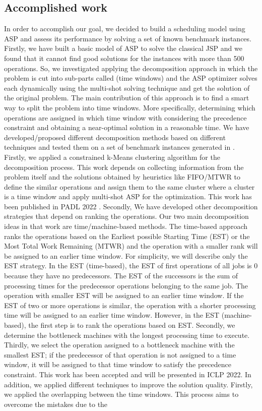 \documentclass[submission,copyright,creativecommons]{eptcs}
\begin{document}
\subsection{Accomplished work}
In order to accomplish our goal, we decided to build a scheduling model using ASP and assess its performance by solving a set of known benchmark instances. Firstly, we have built a basic model of ASP to solve the classical JSP and we found that it cannot find good solutions for the instances with more than 500 operations. So, we investigated applying the decomposition approach in which the problem is cut into sub-parts called (time windows) and the ASP optimizer solves each dynamically using the multi-shot solving technique \cite{gebser2019multi} and get the solution of the original problem. The main contribution of this approach is to find a smart way to split the problem into time windows. More specifically, determining which operations are assigned in which time window with considering the precedence constraint and obtaining a near-optimal solution in a reasonable time. We have developed/proposed different decomposition methods based on different techniques and tested them on a set of benchmark instances generated in \cite{taillard1993benchmarks,demirkol1998benchmarks}. Firstly, we applied a constrained k-Means clustering algorithm for the decomposition process. This work depends on collecting information from the problem itself and the solutions obtained by heuristics like FIFO/MTWR to define the similar operations and assign them to the same cluster where a cluster is a time window and apply multi-shot ASP for the optimization. This work has been published in PADL 2022 \cite{el2022decomposition}. Secondly, We have developed other decomposition strategies that depend on ranking the operations. Our two main decomposition ideas in that work are time/machine-based methods. The time-based approach ranks the operations based on the Earliest possible Starting Time (EST) or the Most Total Work Remaining (MTWR) and the operation with a smaller rank will be assigned to an earlier time window. For simplicity, we will describe only the EST strategy. In the EST (time-based), the EST of first operations of all jobs is $0$ because they have no predecessors. The EST of the successors is the sum of processing times for the predecessor operations belonging to the same job. The operation with smaller EST will be assigned to an earlier time window. If the EST of two or more operations is similar, the operation with a shorter processing time will be assigned to an earlier time window. However, in the EST (machine-based), the first step is to rank the operations based on EST. Secondly, we determine the bottleneck machines with the longest processing time to execute. Thirdly, we select the operation assigned to a bottleneck machine with the smallest EST; if the predecessor of that operation is not assigned to a time window, it will be assigned to that time window to satisfy the precedence constraint. This work has been accepted and will be presented in ICLP 2022. In addition, we applied different techniques to improve the solution quality. Firstly, we applied the overlapping between the time windows. This process aims to overcome the mistakes due to the 
\end{document}
